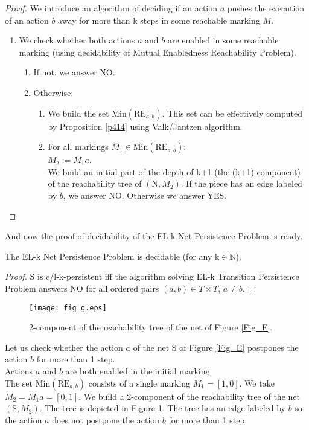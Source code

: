 \documentclass[a4paper]{llncs}
\begin{document}
\begin{proof}
We introduce an algorithm of deciding if an action $a$ pushes the execution of an action $b$ away for more than k steps in some reachable marking $M$.
\begin{enumerate}
\item We check whether both actions $a$ and $b$ are enabled in some reachable marking (using decidability of Mutual Enabledness Reachability Problem).
\begin{enumerate}
\item If not, we answer NO.
\item Otherwise:
\begin{enumerate}
\item We build the set $\mathrm{Min}(\mathrm{RE}_{a,b})$. This set can be effectively computed by Proposition \ref{p414} using Valk/Jantzen algorithm.
\item For all markings $M_1 \in \mathrm{Min}(\mathrm{RE}_{a,b})$:\\
$M_2:=M_1a$. \\
We build an initial part of the depth of k+1 (the (k+1)-component) of the reachability tree of $(\mathrm{N}, M_2)$. If the piece has an edge labeled by $b$, we answer NO. Otherwise we answer YES. 	
\end{enumerate}
\end{enumerate}
\end{enumerate}
\end{proof}
And now the proof of decidability of the EL-k Net Persistence Problem is ready.

\begin{theorem}
\label{t418}
The EL-k Net Persistence Problem is decidable (for any $\mathrm{k}\in \mathbb{N}$).
\end{theorem}

\begin{proof}
S is e/l-k-persistent iff the algorithm solving EL-k Transition Persistence Problem answers NO for all ordered pairs $(a,b)\in T\times T$, $a\neq b$.
\end{proof}
\vspace*{-1cm}
\begin{example}
\label{e_fig_g}
\begin{figure}[h]
\centering
\texttt{[image: fig\_g.eps]}
\caption{2-component of the reachability tree of the net of Figure \ref{Fig_E}.}
\label{Fig_G}
\end{figure}

Let us check whether the action $a$ of the net S of Figure \ref{Fig_E} postpones the action $b$ for more than 1 step.\\
Actions $a$ and $b$ are both enabled in the initial marking. \\
The set $\mathrm{Min}(\mathrm{RE}_{a,b})$ consists of a single marking $M_1=[1,0]$. 
We take $M_2=M_1a=[0,1]$. We build a 2-component of the reachability tree of the net $(\mathrm{S},M_2)$. The tree is depicted in Figure \ref{Fig_G}. The tree has an edge labeled by $b$ so the action $a$ does not postpone the action $b$ for more than 1 step.
\end{example}
\end{document}
